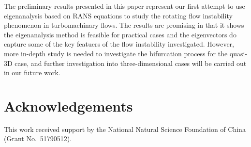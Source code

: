 \documentclass[journal,final]{new-aiaa}
\begin{document}
The preliminary results presented in this paper represent our first
attempt to use eigenanalysis based on RANS equations to study
the rotating flow instability phenomenon in turbomachinary flows.
The results are promising in that it shows the eigenanalysis method
is feasible for practical cases and the eigenvectors do capture some
of the key featuers of the flow instability investigated. However, more in-depth
study is needed to investigate the bifurcation process for the quasi-3D
case, and further investigation into three-dimensional cases will be
carried out in our future work.



\section*{Acknowledgements}
This work received support by the National Natural
Science Foundation of China (Grant No.~51790512).



\end{document}
